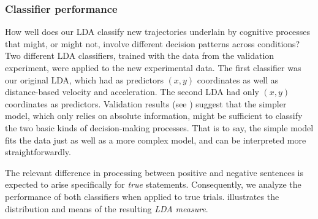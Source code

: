 \documentclass[11pt]{article}
\begin{document}
\subsubsection{Classifier performance}
How well does our LDA classify new trajectories underlain by cognitive processes that might, or might not, involve different decision patterns across conditions?
Two different LDA classifiers, trained with the data from the validation experiment, were applied to the new experimental data. The first classifier was our original LDA, which had as predictors $(x,y)$ coordinates as well as distance-based velocity and acceleration. The second LDA had only $(x,y)$ coordinates as predictors. Validation results (see ) suggest that the simpler model, which only relies on absolute information, might be sufficient to classify the two basic kinds of decision-making processes. That is to say, the simple model fits
the data just as well as a more complex model, and can be interpreted more straightforwardly. 

The relevant difference in processing between positive and negative sentences is expected to arise specifically for \emph{true} statements. Consequently, we analyze the performance of both classifiers when applied to true trials.  illustrates the distribution and means of the resulting \textit{LDA measure}. 
\end{document}
